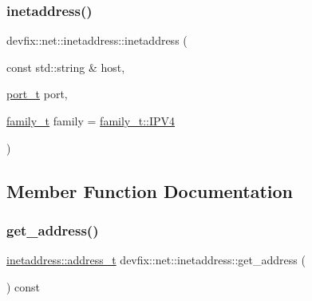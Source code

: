 \subsubsection{\texorpdfstring{inetaddress()}{inetaddress()}\hspace{0.1cm}{\footnotesize\ttfamily [2/2]}}
{\footnotesize\ttfamily devfix\+::net\+::inetaddress\+::inetaddress (\begin{DoxyParamCaption}\item[{const std\+::string \&}]{host,  }\item[{\hyperlink{structdevfix_1_1net_1_1inetaddress_a3eaadc730f2b4625987cf948ea485410}{port\+\_\+t}}]{port,  }\item[{\hyperlink{structdevfix_1_1net_1_1inetaddress_a1c470962b4c9c675d475dba2344b50f4}{family\+\_\+t}}]{family = {\ttfamily \hyperlink{structdevfix_1_1net_1_1inetaddress_a1c470962b4c9c675d475dba2344b50f4ae638ca944d27f97f46a5986a5aa53434}{family\+\_\+t\+::\+I\+P\+V4}} }\end{DoxyParamCaption})}



\subsection{Member Function Documentation}
\mbox{\label{structdevfix_1_1net_1_1inetaddress_a8c606f2398a2d3c9436c4932d6c590b2}} 
\subsubsection{\texorpdfstring{get\+\_\+address()}{get\_address()}}
{\footnotesize\ttfamily \hyperlink{structdevfix_1_1net_1_1inetaddress_a2eb252de4b894131be8fcda68118bd77}{inetaddress\+::address\+\_\+t} devfix\+::net\+::inetaddress\+::get\+\_\+address (\begin{DoxyParamCaption}{ }\end{DoxyParamCaption}) const}

